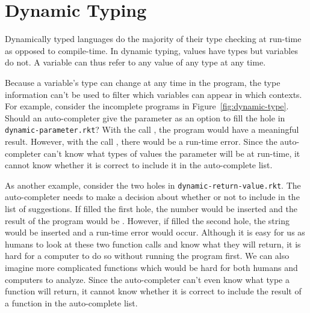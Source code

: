 \documentclass[ms,electronic,twosidetoc,letterpaper,chaptercenter,parttop,lol,lof,lot]{byumsphd}
\begin{document}
\section{Dynamic Typing}

Dynamically typed languages do the majority of their type checking at run-time as opposed to compile-time. In dynamic typing, values have types but variables do not. A variable can thus refer to any value of any type at any time.

Because a variable's type can change at any time in the program, the type information can't be used to filter which variables can appear in which contexts. For example, consider the incomplete programs in Figure~\ref{fig:dynamic-type}. Should an auto-completer give the parameter  as an option to fill the hole in \texttt{dynamic-parameter.rkt}?  With the call , the program would have a meaningful result. However, with the call , there would be a run-time error. Since the auto-completer can't know what types of values the parameter  will be at run-time, it cannot know whether it is correct to include it in the auto-complete list.

As another example, consider the two holes in \texttt{dynamic-return-value.rkt}. The auto-completer needs to make a decision about whether or not to include  in the list of suggestions. If  filled the first hole, the number  would be inserted and the result of the program would be . However, if  filled the second hole, the string  would be inserted and a run-time error would occur. Although it is easy for us as humans to look at these two function calls and know what they will return, it is hard for a computer to do so without running the program first. We can also imagine more complicated functions which would be hard for both humans and computers to analyze. Since the auto-completer can't even know what type a function will return, it cannot know whether it is correct to include the result of a function in the auto-complete list.
\end{document}
